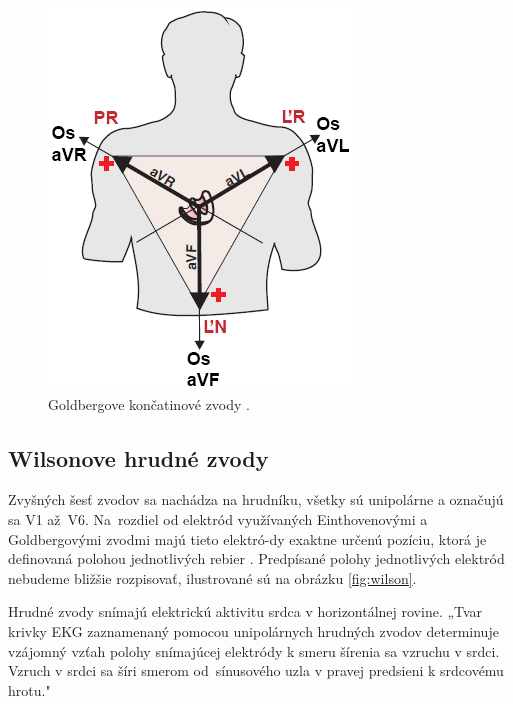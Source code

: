 \begin{figure}[H]
    \centering
    \includegraphics[scale=0.48]{img/goldberger-leads.png}
    \caption{Goldbergove končatinové zvody \cite{Blahút_2017a}.}
    \label{fig:goldberg}
\end{figure}

\subsection{Wilsonove hrudné zvody}

Zvyšných šesť zvodov sa nachádza na hrudníku, všetky sú unipolárne a označujú sa V1 až~V6. Na~rozdiel od elektród využívaných Einthovenovými a Goldbergovými zvodmi majú tieto elektró-dy exaktne určenú pozíciu, ktorá je definovaná polohou jednotlivých rebier \cite{Bada2010}\cite{garcia201512}. Predpísané polohy jednotlivých elektród nebudeme bližšie rozpisovať, ilustrované sú na obrázku \ref{fig:wilson}.

Hrudné zvody snímajú elektrickú aktivitu srdca v horizontálnej rovine. „Tvar krivky EKG zaznamenaný pomocou unipolárnych hrudných zvodov determinuje vzájomný vzťah polohy snímajúcej elektródy k smeru šírenia sa vzruchu v srdci. Vzruch v srdci sa šíri smerom od~sínusového uzla v pravej predsieni k srdcovému hrotu." \cite{Bada2010}

